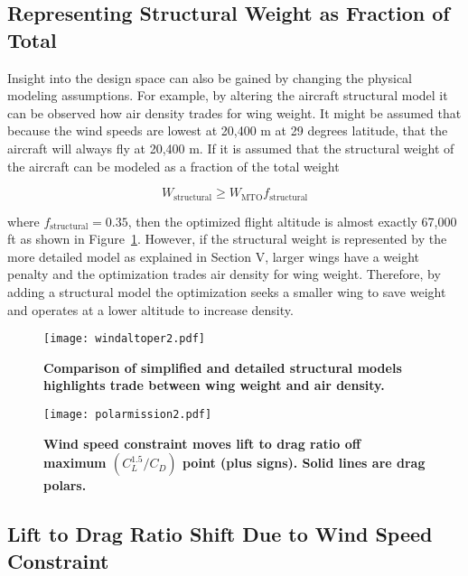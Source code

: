 \subsection{Representing Structural Weight as Fraction of Total}

Insight into the design space can also be gained by changing the physical modeling assumptions.
For example, by altering the aircraft structural model it can be observed how air density trades for wing weight. 
It might be assumed that because the wind speeds are lowest at 20,400 m at 29 degrees latitude, that the aircraft will always fly at 20,400 m.  
If it is assumed that the structural weight of the aircraft can be modeled as a fraction of the total weight 

\begin{equation}
    W_{\text{structural}} \geq W_{\text{MTO}} f_{\text{structural}}
\end{equation}

where $f_{\text{structural}} = 0.35$, then the optimized flight altitude is almost exactly 67,000 ft as shown in Figure~\ref{f:altoper}.  
However, if the structural weight is represented by the more detailed model as explained in Section V, larger wings have a weight penalty and the optimization trades air density for wing weight.
Therefore, by adding a structural model the optimization seeks a smaller wing to save weight and operates at a lower altitude to increase density. 

\begin{figure}[h!]
	\begin{center}
	\texttt{[image: windaltoper2.pdf]}
 \caption{\textbf{Comparison of simplified and detailed structural models highlights trade between wing weight and air density.}}
 \label{f:altoper}
	\end{center}
\end{figure}

\begin{figure}[h!]
	\begin{center}
	\texttt{[image: polarmission2.pdf]}
    \caption{\textbf{Wind speed constraint moves lift to drag ratio off maximum $(C_L^{1.5}/C_D)$ point (plus signs). Solid lines are drag polars.}}
 \label{f:polarmission}
	\end{center}
\end{figure}

\subsection{Lift to Drag Ratio Shift Due to Wind Speed Constraint}


